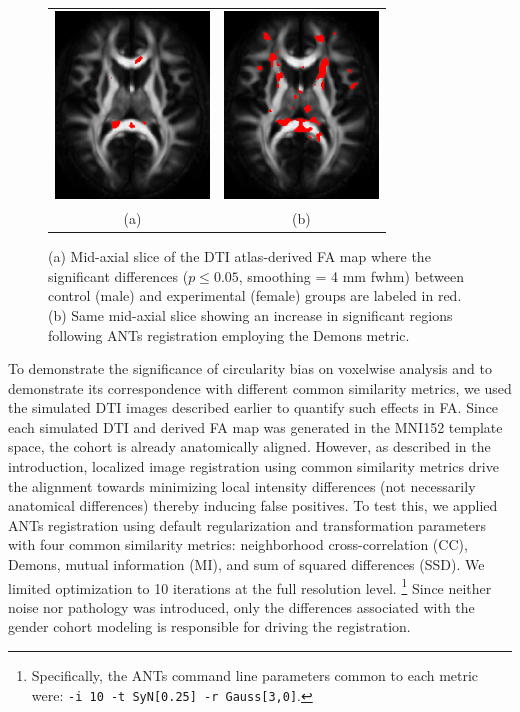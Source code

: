 \documentclass[final,5p,times,twocolumn]{elsarticle}
\begin{document}
\begin{figure}
\begin{center}
\begin{tabular}{cc}
  \includegraphics[width=41mm]{smooth0_truth.png} &
  \includegraphics[width=41mm]{smooth0_demons.png} \\
  (a) & (b)
\end{tabular}
\caption{(a) Mid-axial slice of the DTI atlas-derived FA map where the 
significant differences ($p \leq 0.05$, smoothing = 4 mm fwhm) between control (male) and 
experimental (female) groups are labeled in red.  (b) Same mid-axial 
slice showing an increase in significant regions following ANTs 
registration employing the Demons metric.
}
\label{fig:simulated_significance}
\end{center}        
\end{figure}





To demonstrate the significance of circularity bias on voxelwise 
analysis and to demonstrate its correspondence with different
common similarity metrics, we used the simulated DTI images 
described earlier to quantify such effects in FA.
Since each simulated DTI and derived FA map was generated in the
MNI152 template space, the cohort is already anatomically
aligned.  However, as described in the introduction, localized
image registration using common similarity metrics drive the 
alignment towards minimizing local intensity differences (not necessarily
anatomical differences) thereby
inducing false positives.  To test this, we applied ANTs registration
using default regularization and transformation parameters with
four common similarity metrics:  neighborhood cross-correlation (CC), 
Demons, mutual information (MI), and sum of squared differences (SSD).
We limited optimization to 10 iterations at the full resolution 
level.%
\footnote{
Specifically, the ANTs command line parameters common to each metric were:
{\tt -i 10 -t SyN[0.25] -r Gauss[3,0]}.
}
Since neither noise nor pathology was introduced, only the differences
associated with the gender cohort modeling is responsible for driving
the registration.
\end{document}
